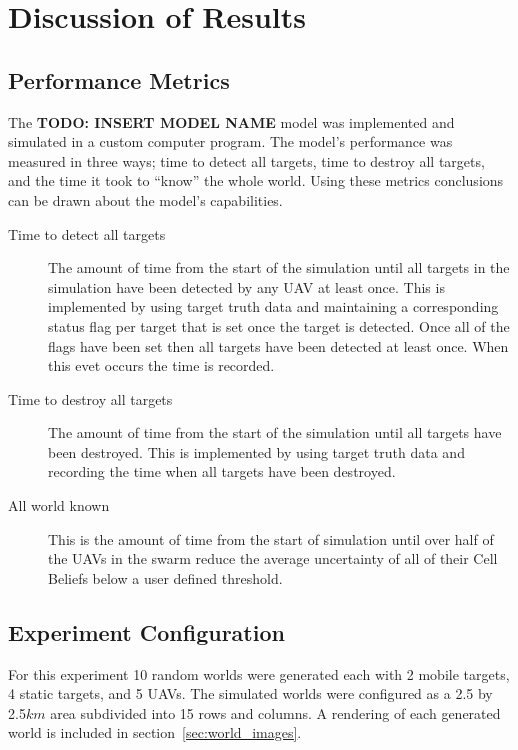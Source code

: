 \chapter{Discussion of Results}
\label{chap:results}

\section{Performance Metrics}
The \textbf{TODO: INSERT MODEL NAME} model was implemented and simulated in a custom computer program.  The model's performance was measured in three ways; time to detect all targets, time to destroy all targets, and the time it took to ``know'' the whole world.  Using these metrics conclusions can be drawn about the model's capabilities.

\begin{description}
	\item [Time to detect all targets] The amount of time from the start of the simulation until all targets in the simulation have been detected by any UAV at least once.  This is implemented by using target truth data and maintaining a corresponding status flag per target that is set once the target is detected.  Once all of the flags have been set then all targets have been detected at least once.  When this evet occurs the time is recorded.
	
	\item[Time to destroy all targets] The amount of time from the start of the simulation until all targets have been destroyed.  This is implemented by using target truth data and recording the time when all targets have been destroyed.
	
	\item[All world known] This is the amount of time from the start of simulation until over half of the UAVs in the swarm reduce the average uncertainty of all of their Cell Beliefs below a user defined threshold.
\end{description}


\section{Experiment Configuration}
For this experiment 10 random worlds were generated each with 2 mobile targets, 4 static targets, and 5 UAVs.  The simulated worlds were configured as a 2.5 by 2.5$km$ area subdivided into 15 rows and columns.  A rendering of each generated world is included in section~\ref{sec:world_images}.

